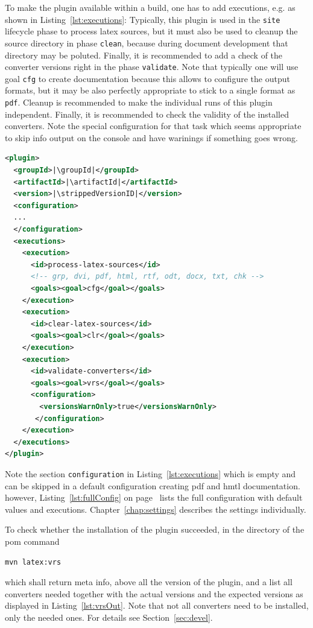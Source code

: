 \documentclass[12pt]{book}
\begin{document}
To make the plugin available within a build,
one has to add executions, e.g. as shown in Listing~\ref{lst:executions}:
Typically, this plugin is used in the \texttt{site} lifecycle phase 
to process latex sources,
but it must also be used to cleanup the source directory
in phase \texttt{clean},
because during document development that directory may be poluted.
Finally, it is recommended to add a check of the converter versions
right in the phase \texttt{validate}.
Note that typically one will use goal \texttt{cfg}
to create documentation because this allows to configure the output formats,
but it may be also perfectly appropriate to stick to a single format
as \texttt{pdf}.
Cleanup is recommended to make the individual runs of this plugin independent.
Finally, it is recommended to check the validity of the installed converters.
Note the special configuration for that task
which seems appropriate to skip info output on the console
and have warinings if something goes wrong. 


\begin{lstlisting}[language=xml, basicstyle=\footnotesize,
escapechar=|,
float, captionpos=hb, label={lst:executions}, 
caption={The executions of this plugin}]
<plugin>
  <groupId>|\groupId|</groupId>
  <artifactId>|\artifactId|</artifactId>
  <version>|\strippedVersionID|</version>
  <configuration>
  ...
  </configuration>
  <executions>
    <execution>
      <id>process-latex-sources</id>
      <!-- grp, dvi, pdf, html, rtf, odt, docx, txt, chk -->
      <goals><goal>cfg</goal></goals>
    </execution>
    <execution>
      <id>clear-latex-sources</id>
      <goals><goal>clr</goal></goals>
    </execution>
    <execution>
      <id>validate-converters</id>
      <goals><goal>vrs</goal></goals>
      <configuration>
        <versionsWarnOnly>true</versionsWarnOnly>
       </configuration>
    </execution>
  </executions>
</plugin>
\end{lstlisting}

Note the section \texttt{configuration} in Listing~\ref{lst:executions}
which is empty and can be skipped in a default configuration
creating pdf and hmtl documentation.
however, Listing~\ref{lst:fullConfig} on page~\pageref{lst:fullConfig}
lists the full configuration with default values
and executions.
Chapter~\ref{chap:settings} describes the settings individually.

To check whether the installation of the plugin succeeded,
in the directory of the pom command
%
\begin{Verbatim}
mvn latex:vrs
\end{Verbatim}
%
which shall return meta info, above all the version of the plugin,
and a list all converters needed
together with the actual versions and the expected versions
as displayed in Listing~\ref{lst:vrsOut}.
Note that not all converters need to be installed, only the needed ones.
For details see Section~\ref{sec:devel}.
\medskip
\end{document}
